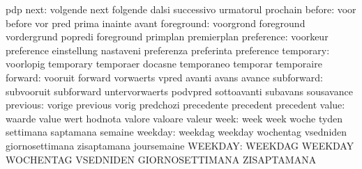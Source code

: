                            pdp
                     next: volgende                  next
                           folgende                  dalsi
                           successivo                urmatorul
                           prochain
                   before: voor                      before
                           vor                       pred
                           prima                     inainte
                           avant
               foreground: voorgrond                 foreground
                           vordergrund               popredi
                           foreground                primplan
                           premierplan
               preference: voorkeur                  preference
                           einstellung               nastaveni
                           preferenza                preferinta
                           preference
                temporary: voorlopig                 temporary
                           temporaer                 docasne
                           temporaneo                temporar
                           temporaire
                  forward: vooruit                   forward
                           vorwaerts                 vpred
                           avanti                    avans
                           avance
               subforward: subvooruit                subforward
                           untervorwaerts            podvpred
                           sottoavanti               subavans
                           sousavance
                 previous: vorige                    previous
                           vorig                     predchozi
                           precedente                precedent
                           precedent
                    value: waarde                    value
                           wert                      hodnota
                           valore                    valoare
                           valeur
                     week: week                      week
                           woche                     tyden
                           settimana                 saptamana
                           semaine
                  weekday: weekdag                   weekday
                           wochentag                 vsedniden
                           giornosettimana           zisaptamana
                           joursemaine
                  WEEKDAY: WEEKDAG                   WEEKDAY
                           WOCHENTAG                 VSEDNIDEN
                           GIORNOSETTIMANA           ZISAPTAMANA

